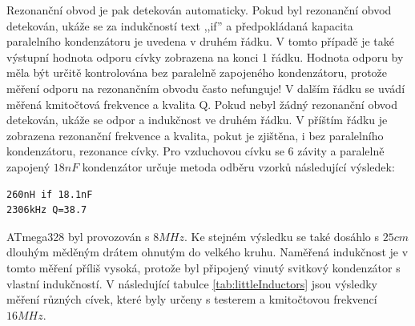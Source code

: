 Rezonanční obvod je pak detekován automaticky.
Pokud byl rezonanční obvod detekován, ukáže se za indukčností text ,,if'' a předpokládaná
kapacita paralelního kondenzátoru je uvedena v druhém řádku.
V tomto případě je také výstupní hodnota odporu cívky zobrazena na konci 1 řádku.
Hodnota odporu by měla být určitě kontrolována bez paralelně zapojeného kondenzátoru,
protože měření odporu na rezonančním obvodu často nefunguje!
V dalším řádku se uvádí měřená kmitočtová frekvence a kvalita Q.
Pokud nebyl žádný rezonanční obvod detekován, ukáže se odpor a indukčnost ve druhém řádku.
V příštím řádku je zobrazena rezonanční frekvence a kvalita, pokut je zjištěna,
i bez paralelního kondenzátoru, rezonance cívky.
Pro vzduchovou cívku se 6 závity a paralelně zapojený \(18nF\) kondenzátor 
určuje metoda odběru vzorků následující výsledek:

\begin{verbatim}
260nH if 18.1nF
2306kHz Q=38.7
\end{verbatim}

ATmega328 byl provozován s \(8MHz\).
Ke stejném výsledku se také dosáhlo s \(25cm\) dlouhým měděným drátem ohnutým do velkého kruhu.
Naměřená indukčnost je v tomto měření příliš vysoká, protože byl připojený vinutý svitkový
kondenzátor s vlastní indukčností.
V následující tabulce \ref{tab:littleInductors} jsou výsledky měření různých cívek,
které byly určeny s testerem a kmitočtovou frekvencí \(16MHz\).

